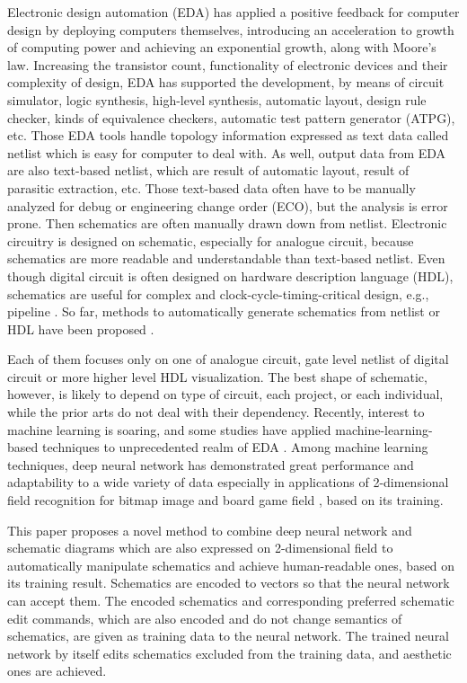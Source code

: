 \documentclass[twocolumn]{article}
\begin{document}
Electronic design automation (EDA) has applied a positive feedback
for computer design by deploying computers themselves,
introducing an acceleration to growth of computing power
and achieving an exponential growth, along with Moore's law.
Increasing the transistor count,
functionality of electronic devices and their complexity of design,
EDA has supported the development, by means of circuit simulator,
logic synthesis, high-level synthesis, automatic layout,
design rule checker, kinds of equivalence checkers,
automatic test pattern generator (ATPG), etc.
Those EDA tools handle topology information expressed as text data
called netlist which is easy for computer to deal with.
As well, output data from EDA are also text-based netlist,
which are result of automatic layout, result of parasitic extraction, etc.
Those text-based data often have to be manually analyzed
for debug or engineering change order (ECO),
but the analysis is error prone.
Then schematics are often manually drawn down from netlist.
Electronic circuitry is designed on schematic,
especially for analogue circuit,
because schematics are more readable and understandable
than text-based netlist.
Even though digital circuit is often designed
on hardware description language (HDL),
schematics are useful for complex and clock-cycle-timing-critical design,
e.g., pipeline \cite{ph}.
So far, methods to automatically generate schematics from netlist or HDL
have been proposed
\cite{nauts, anshul, fiduccia, chun, green, tsung, bogdan}.

Each of them focuses only on one of analogue circuit,
gate level netlist of digital circuit
or more higher level HDL visualization.
The best shape of schematic, however, is likely to depend on
type of circuit, each project, or each individual,
while the prior arts do not deal with their dependency.
Recently, interest to machine learning is soaring,
and some studies have applied machine-learning-based techniques
to unprecedented realm of EDA \cite{fan, sourav}.
Among machine learning techniques,
deep neural network has demonstrated great performance
and adaptability to a wide variety of data
especially in applications of 2-dimensional field recognition
for bitmap image \cite{nips} and board game field \cite{alphago},
based on its training.

This paper proposes a novel method to combine deep neural network and
schematic diagrams which are also expressed on 2-dimensional field
to automatically manipulate schematics
and achieve human-readable ones, based on its training result.
Schematics are encoded to vectors so that the neural network can accept them.
The encoded schematics and corresponding preferred schematic edit commands,
which are also encoded and do not change semantics of schematics,
are given as training data to the neural network.
The trained neural network by itself edits schematics excluded
from the training data, and aesthetic ones are achieved.
\end{document}
